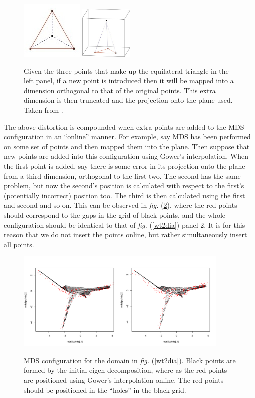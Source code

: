 \documentclass[a4paper,10pt]{article}
\newcommand{\fig}[1]{\emph{fig.} (\ref{#1})}
\begin{document}
\begin{figure}
\centering
\includegraphics{figs/boj0.jpg} \includegraphics[width=1in]{figs/boj1.jpg} \\
\caption{Given the three points that make up the equilateral triangle in the left panel, if a new point is introduced then it will be mapped into a dimension orthogonal to that of the original points. This extra dimension is then truncated and the projection onto the plane used. Taken from \cite{Boj2009}.}
\label{bojinsert}
\end{figure}

The above distortion is compounded when extra points are added to the MDS configuration in an ``online'' manner. For example, say MDS has been performed on some set of points and then mapped them into the plane. Then suppose that new points are added into this configuration using Gower's interpolation. When the first point is added, say there is some error in its projection onto the plane from a third dimension, orthogonal to the first two. The second has the same problem, but now the second's position is calculated with respect to the first's (potentially incorrect) position too. The third is then calculated using the first and second and so on. This can be observed in \fig{gowererror}, where the red points should correspond to the gaps in the grid of black points, and the whole configuration should be identical to that of \fig{wt2dia} panel 2. It is for this reason that we do not insert the points online, but rather simultaneously insert all points.

\begin{figure}
\centering
\includegraphics[width=4in]{figs/gowererror.pdf} \\
\caption{MDS configuration for the domain in \fig{wt2dia}. Black points are formed by the initial eigen-decomposition, where as the red points are positioned using Gower's interpolation online. The red points should be positioned in the ``holes'' in the black grid.}
\label{gowererror}
\end{figure}
\end{document}
